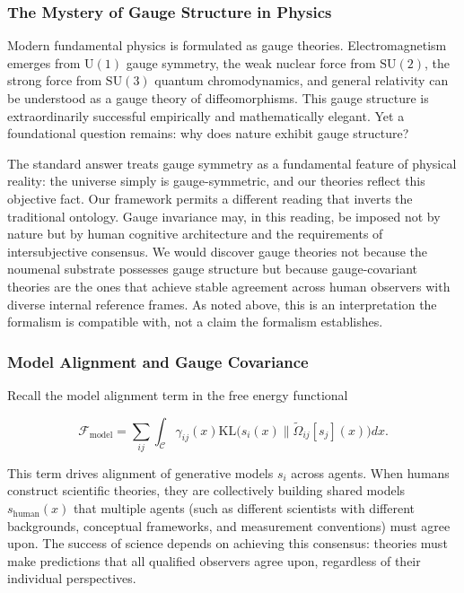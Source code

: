 \documentclass[11pt]{article}
\begin{document}
\subsubsection{The Mystery of Gauge Structure in Physics}

Modern fundamental physics is formulated as gauge theories. Electromagnetism emerges from $\mathrm{U}(1)$ gauge symmetry, the weak nuclear force from $\mathrm{SU}(2)$, the strong force from $\mathrm{SU}(3)$ quantum chromodynamics, and general relativity can be understood as a gauge theory of diffeomorphisms. This gauge structure is extraordinarily successful empirically and mathematically elegant. Yet a foundational question remains: why does nature exhibit gauge structure?

The standard answer treats gauge symmetry as a fundamental feature of physical reality: the universe simply is gauge-symmetric, and our theories reflect this objective fact. Our framework permits a different reading that inverts the traditional ontology. Gauge invariance may, in this reading, be imposed not by nature but by human cognitive architecture and the requirements of intersubjective consensus. We would discover gauge theories not because the noumenal substrate possesses gauge structure but because gauge-covariant theories are the ones that achieve stable agreement across human observers with diverse internal reference frames. As noted above, this is an interpretation the formalism is compatible with, not a claim the formalism establishes.

\subsubsection{Model Alignment and Gauge Covariance}

Recall the model alignment term in the free energy functional

\begin{equation}
\mathcal{F}_{\text{model}} = \sum_{ij} \int_{\mathcal{C}} \gamma_{ij}(x)  \mathrm{KL}\big(s_i(x) \| \tilde{\Omega}_{ij}[s_j](x)\big)  dx.
\end{equation}

This term drives alignment of generative models $s_i$ across agents. When humans construct scientific theories, they are collectively building shared models $s_{\text{human}}(x)$ that multiple agents (such as different scientists with different backgrounds, conceptual frameworks, and measurement conventions) must agree upon. The success of science depends on achieving this consensus: theories must make predictions that all qualified observers agree upon, regardless of their individual perspectives.
\end{document}
